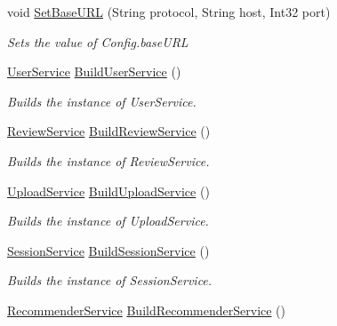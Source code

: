 \begin{DoxyCompactItemize}
void \hyperlink{classcom_1_1shephertz_1_1app42_1_1paas_1_1sdk_1_1csharp_1_1_service_a_p_i_a7426112cd66a419891ece1fe6eae62cd}{Set\+Base\+U\+R\+L} (String protocol, String host, Int32 port)
\begin{DoxyCompactList}\small\item\em Sets the value of Config.\+base\+U\+R\+L \end{DoxyCompactList}\item 
\hyperlink{classcom_1_1shephertz_1_1app42_1_1paas_1_1sdk_1_1csharp_1_1user_1_1_user_service}{User\+Service} \hyperlink{classcom_1_1shephertz_1_1app42_1_1paas_1_1sdk_1_1csharp_1_1_service_a_p_i_ae6d47672efa6a015b3f405be525daf3b}{Build\+User\+Service} ()
\begin{DoxyCompactList}\small\item\em Builds the instance of User\+Service. \end{DoxyCompactList}\item 
\hyperlink{classcom_1_1shephertz_1_1app42_1_1paas_1_1sdk_1_1csharp_1_1review_1_1_review_service}{Review\+Service} \hyperlink{classcom_1_1shephertz_1_1app42_1_1paas_1_1sdk_1_1csharp_1_1_service_a_p_i_ac3c10275a3470e8c0798627fbcc6cbc0}{Build\+Review\+Service} ()
\begin{DoxyCompactList}\small\item\em Builds the instance of Review\+Service. \end{DoxyCompactList}\item 
\hyperlink{classcom_1_1shephertz_1_1app42_1_1paas_1_1sdk_1_1csharp_1_1upload_1_1_upload_service}{Upload\+Service} \hyperlink{classcom_1_1shephertz_1_1app42_1_1paas_1_1sdk_1_1csharp_1_1_service_a_p_i_a4ba4121609421b749748755c2ce2a79b}{Build\+Upload\+Service} ()
\begin{DoxyCompactList}\small\item\em Builds the instance of Upload\+Service. \end{DoxyCompactList}\item 
\hyperlink{classcom_1_1shephertz_1_1app42_1_1paas_1_1sdk_1_1csharp_1_1session_1_1_session_service}{Session\+Service} \hyperlink{classcom_1_1shephertz_1_1app42_1_1paas_1_1sdk_1_1csharp_1_1_service_a_p_i_ac5d47a1591d73a1ac642ba4650b0f8bb}{Build\+Session\+Service} ()
\begin{DoxyCompactList}\small\item\em Builds the instance of Session\+Service. \end{DoxyCompactList}\item 
\hyperlink{classcom_1_1shephertz_1_1app42_1_1paas_1_1sdk_1_1csharp_1_1recommend_1_1_recommender_service}{Recommender\+Service} \hyperlink{classcom_1_1shephertz_1_1app42_1_1paas_1_1sdk_1_1csharp_1_1_service_a_p_i_a836d79a8d480ea93b53f6b70f61e899f}{Build\+Recommender\+Service} ()

\end{DoxyCompactItemize}
